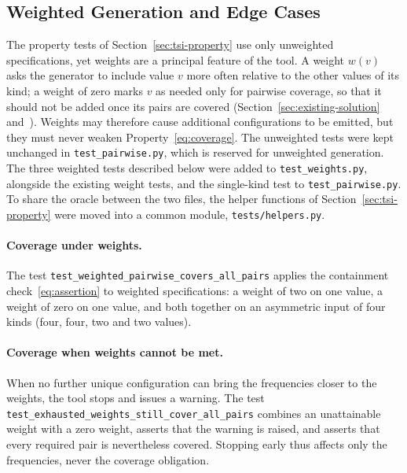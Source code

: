 \documentclass[
  digital, %
  oneside, %
  lof,     %
  nolot,     %
]{fithesis4}
\begin{document}
\subsection{Weighted Generation and Edge Cases}
\label{sec:tsi-weights}

The property tests of Section~\ref{sec:tsi-property} use only unweighted
specifications, yet weights are a principal feature of the tool. A weight $w(v)$
asks the generator to include value $v$ more often relative to the other values
of its kind; a weight of zero marks $v$ as needed only for pairwise coverage, so
that it should not be added once its pairs are covered
(Section~\ref{sec:existing-solution} and~\cite[p.~26]{Urban2024thesis}). Weights may therefore
cause additional configurations to be emitted, but they must never weaken
Property~\eqref{eq:coverage}. The unweighted tests were kept unchanged in
\texttt{test\_pairwise.py}, which is reserved for unweighted generation. The
three weighted tests described below were added to \texttt{test\_weights.py},
alongside the existing weight tests, and the single-kind test to
\texttt{test\_pairwise.py}. To share the oracle between the two files, the
helper functions of Section~\ref{sec:tsi-property} were moved into a common
module, \texttt{tests/helpers.py}.

\paragraph{Coverage under weights.} The test
\texttt{test\_weighted\_pairwise\_covers\_all\_pairs} applies the containment
check~\eqref{eq:assertion} to weighted specifications: a weight of two on one
value, a weight of zero on one value, and both together on an asymmetric input
of four kinds (four, four, two and two values).

\paragraph{Coverage when weights cannot be met.} When no further unique
configuration can bring the frequencies closer to the weights, the tool stops and
issues a warning. The test
\texttt{test\_exhausted\_weights\_still\_cover\_all\_pairs} combines an
unattainable weight with a zero weight, asserts that the warning is raised, and
asserts that every required pair is nevertheless covered. Stopping early thus
affects only the frequencies, never the coverage obligation.
\end{document}
